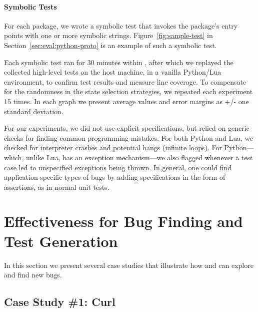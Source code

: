 \paragraph{Symbolic Tests}

For each package, we wrote a symbolic test that invokes the package's entry points with one or more symbolic strings.  
Figure~\ref{fig:sample-test} in Section~\ref{sec:eval:python-proto} is an example of such a symbolic test.

Each symbolic test ran for 30 minutes within \chef, after which we replayed the collected high-level tests on the host machine, in a vanilla Python/Lua environment, to confirm test results and measure line coverage.  To compensate for the randomness in the state selection strategies, we repeated each experiment 15 times.  In each graph we present average values and error margins as +/- one standard deviation.

For our experiments, we did not use explicit specifications, but relied on generic checks for finding common programming mistakes.  For both Python and Lua, we checked for interpreter crashes and potential hangs (infinite loops). 
For Python---which, unlike Lua, has an exception mechanism---we also flagged whenever a test case led to unspecified exceptions being thrown.
%
In general, one could find application-specific types of bugs by adding specifications in the form of assertions, as in normal unit tests.


\section{Effectiveness for Bug Finding and Test Generation}
\label{sec:eval:bug-finding}

In this section we present several case studies that illustrate how \cnine and \chef can explore and find new bugs. %

\subsection{Case Study \#1: Curl}
\label{sec:eval:curl}

